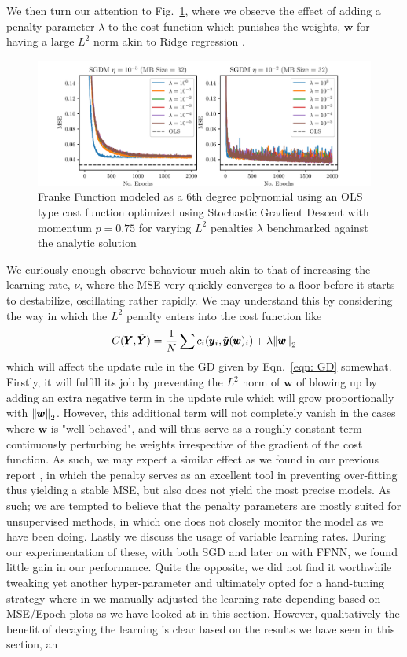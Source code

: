\documentclass[reprint, english, nofootinbib]{revtex4-2}
\begin{document}
We then turn our attention to Fig.~\ref{fig: SGD penalty}, where we observe the effect of adding a penalty parameter $\lambda$ to the cost function which punishes the weights, $\pmb w$ for having a large $L^2$ norm akin to Ridge regression \cite{4155_project_1}.
\begin{figure}
    \includegraphics[width=\columnwidth]{SGD_learning_penalty.pdf}
    \caption{\label{fig: SGD penalty}Franke Function modeled as a 6th degree polynomial using an OLS type cost function optimized using Stochastic Gradient Descent with momentum $p=0.75$ for varying $L^2$ penalties $\lambda$ benchmarked against the analytic solution}
\end{figure}
We curiously enough observe behaviour much akin to that of increasing the learning rate, $\nu$, where the MSE very quickly converges to a floor before it starts to destabilize, oscillating rather rapidly. We may understand this by considering the way in which the $L^2$ penalty enters into the cost function like
\begin{equation}
    C(\pmb Y, \tilde{\pmb Y}) = \frac{1}{N}\sum c_i\qty(\pmb y_i, \tilde{\pmb y}(\pmb w)_i) + \lambda \norm{\pmb w}_2
\end{equation}
which will affect the update rule in the GD given by Eqn.~\ref{eqn: GD} somewhat. Firstly, it will fulfill its job by preventing the $L^2$ norm of $\pmb w$ of blowing up by adding an extra negative term in the update rule which will grow proportionally with $\norm{\pmb w}_2$. However, this additional term will not completely vanish in the cases where $\pmb w$ is "well behaved", and will thus serve as a roughly constant term continuously perturbing he weights irrespective of the gradient of the cost function. As such, we may expect a similar effect as we found in our previous report \cite{4155_project_1}, in which the penalty serves as an excellent tool in preventing over-fitting thus yielding a stable MSE, but also does not yield the most precise models. As such; we are tempted to believe that the penalty parameters are mostly suited for unsupervised methods, in which one does not closely monitor the model as we have been doing.
%
Lastly we discuss the usage of variable learning rates. During our experimentation of these, with both SGD and later on with FFNN, we found little gain in our performance. Quite the opposite, we did not find it worthwhile tweaking yet another hyper-parameter and ultimately opted for a hand-tuning strategy where in we manually adjusted the learning rate depending based on MSE/Epoch plots as we have looked at in this section. However, qualitatively the benefit of decaying the learning is clear based on the results we have seen in this section, an
\end{document}
